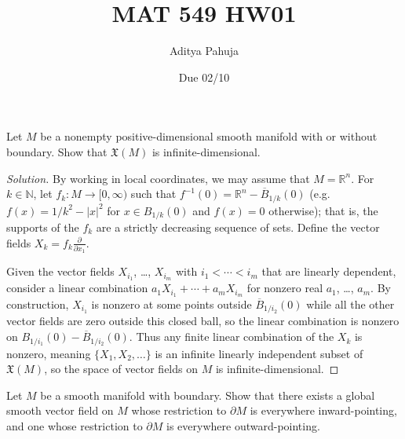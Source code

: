 \documentclass[10pt]{article}
\title{MAT 549 HW01}
\author{\large Aditya Pahuja}
\date{\large Due 02/10}
\providecommand{\ol}{\overline}
\providecommand{\NN}{\mathbb N}
\providecommand{\RR}{\mathbb R}
\providecommand{\inv}{^{-1}}
\newenvironment{soln}{\begin{proof}[Solution]}{\end{proof}}
\providecommand{\abs}[1]{\left\lvert #1\right\rvert}
\begin{document}
\maketitle

\begin{problem}
    Let $M$ be a nonempty positive-dimensional smooth manifold
    with or without boundary. Show that $\mathfrak X(M)$
    is infinite-dimensional.
\end{problem}

\begin{soln}
    By working in local coordinates, we may assume that $M = \RR^n$.
    For $k\in\NN$, let $f_k\colon M\to[0,\infty)$ such that
    $f\inv(0) = \RR^n - \ol B_{1/k}(0)$ (e.g. $f(x) = 1/k^2 - \abs{x}^2$
    for $x\in B_{1/k}(0)$ and $f(x) = 0$ otherwise);
    that is, the supports of the $f_k$ are a strictly
    decreasing sequence of sets. Define the vector fields
    $X_k = f_k\frac{\partial}{\partial x_1}$.

    Given the vector fields $X_{i_1}$, \dots, $X_{i_m}$
    with $i_1 < \cdots < i_m$ that are linearly dependent,
    consider a linear combination $a_1 X_{i_1} + \cdots + a_m X_{i_m}$ for
    nonzero real $a_1$, \dots, $a_m$.
    By construction, $X_{i_1}$ is nonzero at some points
    outside $\ol B_{1/i_2}(0)$ while all the other vector fields
    are zero outside this closed ball, so the linear combination
    is nonzero on $B_{1/i_1}(0) - \ol B_{1/i_2}(0)$.
    Thus any finite linear combination of the $X_k$ is nonzero,
    meaning $\{X_1,X_2,\dots\}$ is an infinite linearly independent
    subset of $\mathfrak X(M)$, so the space of vector fields on $M$
    is infinite-dimensional.
\end{soln}

\begin{problem}
    Let $M$ be a smooth manifold with boundary.
    Show that there exists a global smooth vector field on $M$
    whose restriction to $\partial M$ is everywhere inward-pointing,
    and one whose restriction to $\partial M$
    is everywhere outward-pointing.
\end{problem}
\end{document}
